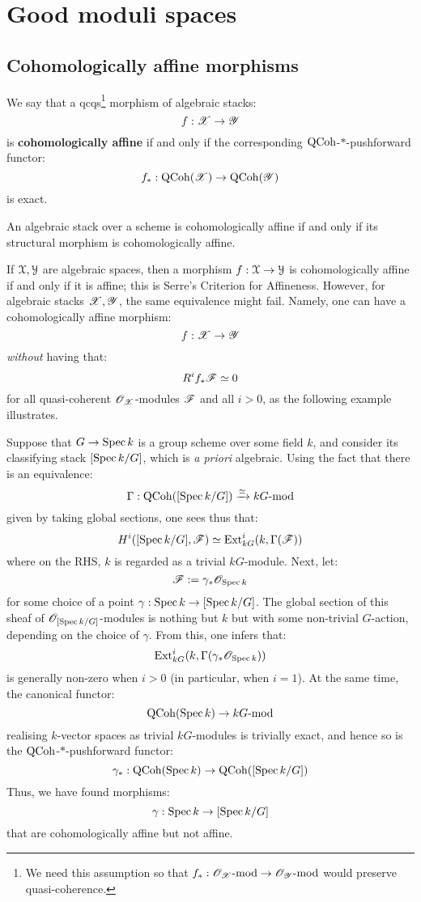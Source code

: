 \section{Good moduli spaces}
    \subsection{Cohomologically affine morphisms}
        \begin{definition} \label{def: cohomologically_affine_morphisms}
            We say that a qcqs\footnote{We need this assumption so that $f_*: \mathscr{O}_{\mathscr{X}}\text{-}\mathrm{mod} \to \mathscr{O}_{\mathscr{Y}}\text{-}\mathrm{mod}$ would preserve quasi-coherence.} morphism of algebraic stacks:
                $$f: \mathscr{X} \to \mathscr{Y}$$
            is \textbf{cohomologically affine} if and only if the corresponding $\mathrm{QCoh}$-$*$-pushforward functor:
                $$f_*: \mathrm{QCoh}(\mathscr{X}) \to \mathrm{QCoh}(\mathscr{Y})$$
            is exact. 

            An algebraic stack over a scheme is cohomologically affine if and only if its structural morphism is cohomologically affine.
        \end{definition}
        If $\mathcal{X}, \mathcal{Y}$ are algebraic spaces, then a morphism $f: \mathcal{X} \to \mathcal{Y}$ is cohomologically affine if and only if it is affine; this is Serre's Criterion for Affineness. However, for algebraic stacks $\mathscr{X}, \mathscr{Y}$, the same equivalence might fail. Namely, one can have a cohomologically affine morphism:
            $$f: \mathscr{X} \to \mathscr{Y}$$
        \textit{without} having that:
            $$R^if_*\mathscr{F} \simeq 0$$
        for all quasi-coherent $\mathscr{O}_{\mathscr{X}}$-modules $\mathscr{F}$ and all $i > 0$, as the following example illustrates.
        \begin{example} \label{example: cohomologically_affine_but_not_affine}
            Suppose that $G \to \operatorname{Spec} k$ is a group scheme over some field $k$, and consider its classifying stack $[\operatorname{Spec} k/G]$, which is \textit{a priori} algebraic. Using the fact that there is an equivalence:
                $$\Gamma: \mathrm{QCoh}([\operatorname{Spec} k/G]) \xrightarrow[]{\simeq} kG\text{-}\mathrm{mod}$$
            given by taking global sections, one sees thus that:
                $$H^i([\operatorname{Spec} k/G], \mathscr{F}) \simeq \mathrm{Ext}^i_{kG}(k, \Gamma(\mathscr{F}))$$
            where on the RHS, $k$ is regarded as a trivial $kG$-module. Next, let:
                $$\mathscr{F} := \gamma_*\mathscr{O}_{\operatorname{Spec} k}$$
            for some choice of a point $\gamma: \operatorname{Spec} k \to [\operatorname{Spec} k/G]$. The global section of this sheaf of $\mathscr{O}_{[\operatorname{Spec} k/G]}$-modules is nothing but $k$ but with some non-trivial $G$-action, depending on the choice of $\gamma$. From this, one infers that:
                $$\mathrm{Ext}^i_{kG}(k, \Gamma(\gamma_*\mathscr{O}_{\operatorname{Spec} k}))$$
            is generally non-zero when $i > 0$ (in particular, when $i = 1$). At the same time, the canonical functor:
                $$\mathrm{QCoh}(\operatorname{Spec} k) \to kG\text{-}\mathrm{mod}$$
            realising $k$-vector spaces as trivial $kG$-modules is trivially exact, and hence so is the $\mathrm{QCoh}$-$*$-pushforward functor:
                $$\gamma_*: \mathrm{QCoh}(\operatorname{Spec} k) \to \mathrm{QCoh}([\operatorname{Spec} k/G])$$
            Thus, we have found morphisms:
                $$\gamma: \operatorname{Spec} k \to [\operatorname{Spec} k/G]$$
            that are cohomologically affine but not affine.
        \end{example}
